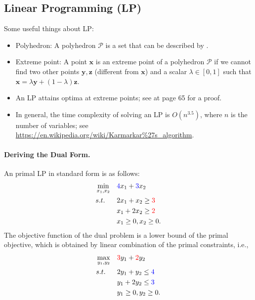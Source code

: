 

\subsection{Linear Programming (LP)}
    Some useful things about LP:
    \begin{itemize}
        \item Polyhedron: A polyhedron $\mathcal{P}$ is a set that can be described by .
        \item Extreme point: A point $\bm{x}$ is an extreme point of a polyhedron $\mathcal{P}$ if we cannot find two other points $\bm{y}, \bm{z}$ (different from $\bm{x}$) and a scalar $\lambda \in [0, 1]$ such that $\bm{x} = \lambda \bm{y} + (1-\lambda) \bm{z}$.
        \item An LP attains optima at extreme points; see \cite{bertsimas1997introduction} at page 65 for a proof.
        \item In general, the time complexity of solving an LP is $O(n^{3.5})$, where $n$ is the number of variables; see \url{https://en.wikipedia.org/wiki/Karmarkar%27s_algorithm}. 
    \end{itemize}

    \paragraph{Deriving the Dual Form.}
    An primal LP in standard form is as follows:
        \begin{equation}
            \begin{aligned}
                & \min_{x_1, x_2} & &   \textcolor{blue}{4} x_1 + \textcolor{blue}{3} x_2 \\
                & s.t.            &  & 2 x_1 + x_2 \ge \textcolor{red}{3} \\
                &                 &  & x_1 + 2 x_2 \ge \textcolor{red}{2} \\
                &                 &  & x_1 \ge 0, x_2 \ge 0.
            \end{aligned}
        \end{equation}
    The objective function of the dual problem is a lower bound of the primal objective, which is obtained by linear combination of the primal constraints, i.e., 
        \begin{equation}
            \begin{aligned}
                & \max_{y_1, y_2} & &   \textcolor{red}{3} y_1 + \textcolor{red}{2} y_2\\
                & s.t.            &  & 2 y_1 + y_2 \le \textcolor{blue}{4} \\
                &                 &  & y_1 + 2 y_2 \le \textcolor{blue}{3} \\
                &                 &  & y_1 \ge 0, y_2 \ge 0.
            \end{aligned}
        \end{equation}
    
